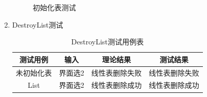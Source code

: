 \documentclass[supercite]{HustGraduPaper}
\theoremstyle{definition}
\begin{document}
\begin{enumerate}
\begin{figure}[htb]
		      \caption{初始化表测试}
	      \end{figure}
	      \newpage
	\item DestroyList测试
	      \begin{table}[htb]
		      \begin{center}
			      \setlength{\tabcolsep}{2.0mm}
			      \caption{DestroyList测试用例表}
			      \label{table13}
			      \begin{tabular}{|c|c|c|c|}
				      \hline
				      测试用例   & 输入    & 理论结果       & 测试结果       \\
				      \hline
				      \hline
				      未初始化表 & 界面选2 & 线性表删除失败 & 线性表删除失败 \\
				      \hline
				      List       & 界面选2 & 线性表删除成功 & 线性表删除成功 \\
				      \hline
			      \end{tabular}
		      \end{center}
	      \end{table}
	      \begin{figure}[htb]
		      \centering
		      \quad
		      \\

\end{figure}
\end{enumerate}
\end{document}
